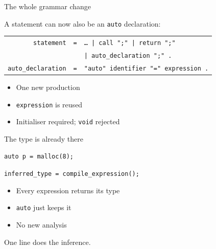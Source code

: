 \documentclass[aspectratio=169]{beamer}
\begin{document}
\begin{frame}{The whole grammar change}
  \begin{center}
    A statement can now also be an \texttt{auto} declaration:
  \end{center}

  \vfill

  \begin{center}
    \footnotesize
    \begin{tabular}{r c l}
      \texttt{statement} & \texttt{=} & \texttt{\dots\ | call ";" | return ";"} \\
                         &            & \alert{\texttt{| auto\_declaration ";" .}} \\[1em]
      \alert{\texttt{auto\_declaration}} & \alert{\texttt{=}}
                         & \alert{\texttt{"auto" identifier "=" expression .}} \\
    \end{tabular}
  \end{center}

  \vfill

  \begin{itemize}
    \item One new production
    \item \texttt{expression} is reused
    \item Initialiser required; \texttt{void} rejected
  \end{itemize}
\end{frame}

\begin{frame}{The type is already there}
  \begin{center}
    \large
    \texttt{auto p = malloc(8);}
  \end{center}

  \vfill

  \begin{center}
    \Large
    \alert{\texttt{inferred\_type = compile\_expression();}}
  \end{center}

  \vfill

  \begin{itemize}
    \item Every expression returns its type
    \item \texttt{auto} just keeps it
    \item No new analysis
  \end{itemize}

  \vfill

  \begin{center}
    \alert{One line does the inference.}
  \end{center}
\end{frame}
\end{document}
